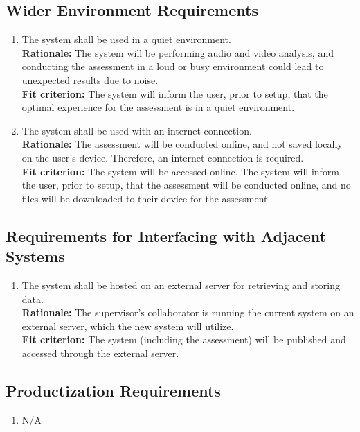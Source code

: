 \documentclass[12pt]{article}
\begin{document}
\subsection{Wider Environment Requirements}
\begin{enumerate}[label={OE-WE\arabic*}. ]
  \item The system shall be used in a quiet environment.\\
  \textbf{Rationale: }The system will be performing audio and video analysis, and conducting the assessment in a loud or busy environment could lead to unexpected results due to noise.\\
  \textbf{Fit criterion: }The system will inform the user, prior to setup, that the optimal experience for the assessment is in a quiet environment. 
  \item The system shall be used with an internet connection.\\
  \textbf{Rationale: }The assessment will be conducted online, and not saved locally on the user's device. Therefore, an internet connection is required.\\
  \textbf{Fit criterion: }The system will be accessed online. The system will inform the user, prior to setup, that the assessment will be conducted online, and no files will be downloaded to their device for the assessment. 
\end{enumerate}
\subsection{Requirements for Interfacing with Adjacent Systems}
\begin{enumerate}[label={OE-IA\arabic*}. ]
  \item The system shall be hosted on an external server for retrieving and storing data.\\
  \textbf{Rationale: }The supervisor's collaborator is running the current system on an external server, which the new system will utilize.\\
  \textbf{Fit criterion: }The system (including the assessment) will be published and accessed through the external server.
\end{enumerate}
\subsection{Productization Requirements}
\begin{enumerate}[label={OE-PR\arabic*}. ]
  \item N/A
\end{enumerate}
\end{document}
